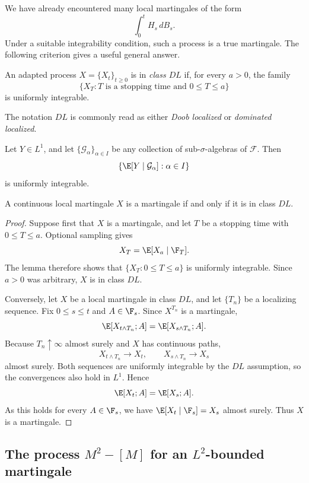 We have already encountered many local martingales of the form
\[
    \int_0^t H_s\,dB_s.
\]
Under a suitable integrability condition, such a process is a true martingale.
The following criterion gives a useful general answer.

\begin{definition}[Class \(DL\)]
An adapted process \(X=\{X_t\}_{t\geq0}\) is in \emph{class \(DL\)} if, for every \(a>0\), the family
\[
    \{X_T:T\text{ is a stopping time and }0\leq T\leq a\}
\]
is uniformly integrable.
\end{definition}

The notation \(DL\) is commonly read as either \emph{Doob localized} or
\emph{dominated localized}.

\begin{lemma}
Let \(Y\in L^1\), and let \(\{\mathcal G_\alpha\}_{\alpha\in I}\) be any collection of sub-\(\sigma\)-algebras of \(\mathcal F\). Then
\[
    \left\{\E[Y\mid\mathcal G_\alpha]:\alpha\in I\right\}
\]
is uniformly integrable.
\end{lemma}

\begin{theorem}
A continuous local martingale \(X\) is a martingale if and only if it is in class \(DL\).
\end{theorem}

\begin{proof}
Suppose first that \(X\) is a martingale, and let \(T\) be a stopping time
with \(0\leq T\leq a\). Optional sampling gives
\[
    X_T=\E[X_a\mid\F_T].
\]
The lemma therefore shows that \(\{X_T:0\leq T\leq a\}\) is uniformly
integrable. Since \(a>0\) was arbitrary, \(X\) is in class \(DL\).

Conversely, let \(X\) be a local martingale in class \(DL\), and let
\(\{T_n\}\) be a localizing sequence. Fix \(0\leq s\leq t\) and
\(A\in\F_s\). Since \(X^{T_n}\) is a martingale,
\[
    \E[X_{t\wedge T_n};A]=\E[X_{s\wedge T_n};A].
\]
Because \(T_n\uparrow\infty\) almost surely and \(X\) has continuous paths,
\[
    X_{t\wedge T_n}\longrightarrow X_t,
    \qquad
    X_{s\wedge T_n}\longrightarrow X_s
\]
almost surely. Both sequences are uniformly integrable by the \(DL\)
assumption, so the convergences also hold in \(L^1\). Hence
\[
    \E[X_t;A]=\E[X_s;A].
\]
As this holds for every \(A\in\F_s\), we have
\(\E[X_t\mid\F_s]=X_s\) almost surely. Thus \(X\) is a martingale.
\end{proof}

\subsection*{The process \texorpdfstring{$M^2-[M]$}{M\textsuperscript{2} - [M]} for an \texorpdfstring{$L^2$}{L2}-bounded martingale}

